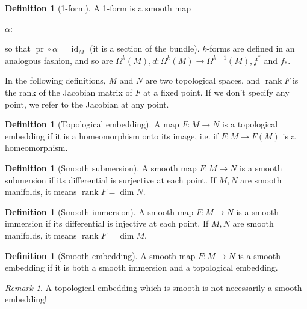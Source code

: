 \documentclass[a4paper,11pt,titlepage, article, oneside]{memoir}
\numberwithin{equation}{section}
\theoremstyle{definition}
\newtheorem{definition}[theorem]{Definition}
\theoremstyle{remark}
\newtheorem{remark}[theorem]{Remark}
\DeclareMathOperator{\id}{id}
\DeclareMathOperator{\rank}{rank}
\DeclareMathOperator{\pr}{pr}
\begin{document}
\begin{definition}[1-form]
A 1-form is a smooth map 
\begin{center}
$\alpha \colon$
\end{center}
so that $\pr \circ \alpha = \id_M$ (it is a section of the bundle). $k$-forms are defined in an analogous fashion, and so are $\Omega^k(M), d \colon \Omega^k(M) \rightarrow \Omega^{k+1}(M), f^*$ and $f_*$.
\end{definition}

In the following definitions, $M$ and $N$ are two topological spaces, and $\rank F$ is the rank of the Jacobian matrix of $F$ at a fixed point. If we don't specify any point, we refer to the Jacobian at any point.

\begin{definition}[Topological embedding]
A map $F\colon M \rightarrow N$ is a topological embedding if it is a homeomorphism onto its image, i.e. if $F\colon M \rightarrow F(M)$ is a homeomorphism.
\end{definition}

\begin{definition}[Smooth submersion] \label{smoothsubm}
A smooth map $F\colon M \rightarrow N$ is a smooth submersion if its differential is surjective at each point. If $M, N$ are smooth manifolds, it means $\rank F = \dim N$.
\end{definition}

\begin{definition}[Smooth immersion]
A smooth map $F \colon M \rightarrow N$ is a smooth immersion if its differential is injective at each point. If $M, N$ are smooth manifolds, it means $\rank F = \dim M$.
\end{definition}

\begin{definition}[Smooth embedding] \label{smoothembedd}
A smooth map $F \colon M \rightarrow N$ is a smooth embedding if it is both a smooth immersion and a topological embedding.
\end{definition}

\begin{remarkbox}\begin{remark}
A topological embedding which is smooth is not necessarily a smooth embedding!
\end{remark}\end{remarkbox}
\end{document}
